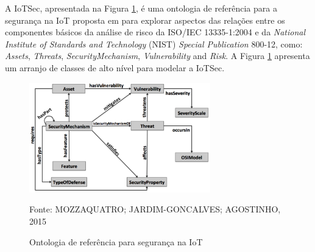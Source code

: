 \documentclass[tid,table]{texufpel} %
\begin{document}
A IoTSec, apresentada na Figura \ref{iotsec-ontology}, é uma ontologia de referência para a segurança na IoT proposta em \cite{mozzaquatro15} para explorar aspectos das relações entre os componentes básicos da análise de risco da ISO/IEC 13335-1:2004 e da \textit{National Institute of Standards and Technology} (NIST) \textit{Special Publication} 800-12, como: \textit{Assets}, \textit{Threats}, \textit{SecurityMechanism}, \textit{Vulnerability} and \textit{Risk}. A Figura \ref{iotsec-ontology} apresenta um arranjo de classes de alto nível para modelar a IoTSec.

\begin{figure}[ht]
\centering
\includegraphics[width=0.7\textwidth]{imagens/iotsec-ontology.png}
\caption{Ontologia de referência para segurança na IoT}
\label{iotsec-ontology}
Fonte: MOZZAQUATRO; JARDIM-GONCALVES; AGOSTINHO, 2015\nocite{mozzaquatro15}
\end{figure}


\end{document}
